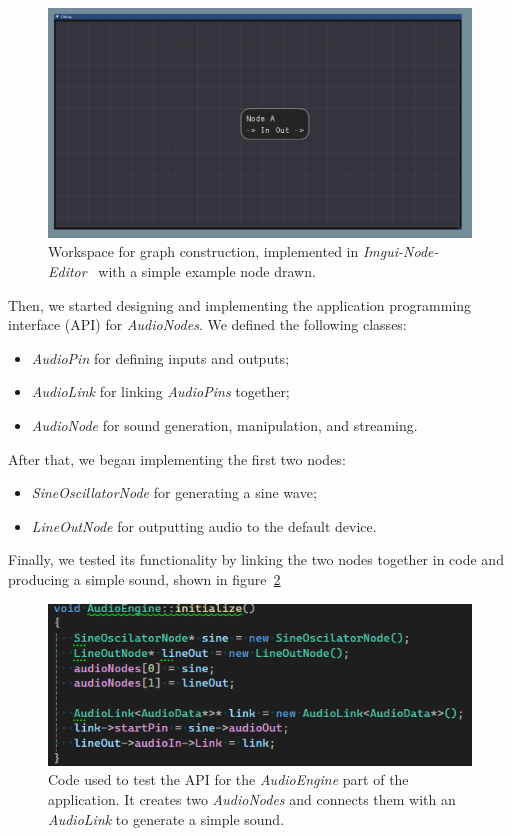 \documentclass[conference]{IEEEtran}
\begin{document}
\begin{figure}[H]
\centering
\includegraphics[width=1.0\linewidth]{graphics/editor-window.png}
\caption{Workspace for graph construction, implemented in \textit{Imgui-Node-Editor}~\cite{imguinodeeditor} with a simple example node drawn.}
\label{fig:editor-window}
\end{figure}

Then, we started designing and implementing the application programming interface (API) for \textit{AudioNodes}. We defined the following classes:
\begin{itemize}
    \item \textit{AudioPin} for defining inputs and outputs;
    \item \textit{AudioLink} for linking \textit{AudioPins} together;
    \item \textit{AudioNode} for sound generation, manipulation, and streaming.
\end{itemize}

After that, we began implementing the first two nodes:
\begin{itemize}
    \item \textit{SineOscillatorNode} for generating a sine wave;
    \item \textit{LineOutNode} for outputting audio to the default device.
\end{itemize}

Finally, we tested its functionality by linking the two nodes together in code and producing a simple sound, shown in figure~\ref{fig:sine-oscillator-demo}

\begin{figure}[H]
\centering
\includegraphics[width=1.0\linewidth]{graphics/sine-oscilator-demo.png}
\caption{Code used to test the API for the \textit{AudioEngine} part of the application. It creates two \textit{AudioNodes} and connects them with an \textit{AudioLink} to generate a simple sound.}
\label{fig:sine-oscillator-demo}
\end{figure}
\end{document}
